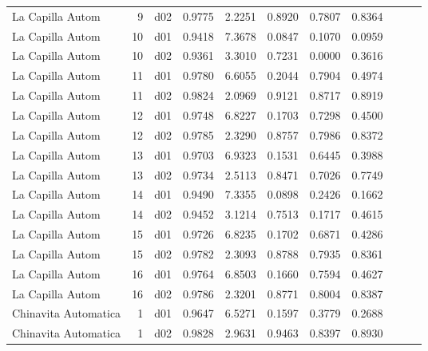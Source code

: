 \begin{landscape}
\begin{longtable}{p{2cm}rrrrrrrrrr}
     La Capilla Autom  &          9 &     d02 &   0.9775 &  2.2251 &        0.8920 &           0.7807 &  0.8364 \\
     La Capilla Autom  &         10 &     d01 &   0.9418 &  7.3678 &        0.0847 &           0.1070 &  0.0959 \\
     La Capilla Autom  &         10 &     d02 &   0.9361 &  3.3010 &        0.7231 &           0.0000 &  0.3616 \\
     La Capilla Autom  &         11 &     d01 &   0.9780 &  6.6055 &        0.2044 &           0.7904 &  0.4974 \\
     La Capilla Autom  &         11 &     d02 &   0.9824 &  2.0969 &        0.9121 &           0.8717 &  0.8919 \\
     La Capilla Autom  &         12 &     d01 &   0.9748 &  6.8227 &        0.1703 &           0.7298 &  0.4500 \\
     La Capilla Autom  &         12 &     d02 &   0.9785 &  2.3290 &        0.8757 &           0.7986 &  0.8372 \\
     La Capilla Autom  &         13 &     d01 &   0.9703 &  6.9323 &        0.1531 &           0.6445 &  0.3988 \\
     La Capilla Autom  &         13 &     d02 &   0.9734 &  2.5113 &        0.8471 &           0.7026 &  0.7749 \\
     La Capilla Autom  &         14 &     d01 &   0.9490 &  7.3355 &        0.0898 &           0.2426 &  0.1662 \\
     La Capilla Autom  &         14 &     d02 &   0.9452 &  3.1214 &        0.7513 &           0.1717 &  0.4615 \\
     La Capilla Autom  &         15 &     d01 &   0.9726 &  6.8235 &        0.1702 &           0.6871 &  0.4286 \\
     La Capilla Autom  &         15 &     d02 &   0.9782 &  2.3093 &        0.8788 &           0.7935 &  0.8361 \\
     La Capilla Autom  &         16 &     d01 &   0.9764 &  6.8503 &        0.1660 &           0.7594 &  0.4627 \\
     La Capilla Autom  &         16 &     d02 &   0.9786 &  2.3201 &        0.8771 &           0.8004 &  0.8387 \\
 Chinavita Automatica  &          1 &     d01 &   0.9647 &  6.5271 &        0.1597 &           0.3779 &  0.2688 \\
 Chinavita Automatica  &          1 &     d02 &   0.9828 &  2.9631 &        0.9463 &           0.8397 &  0.8930 \\

\end{longtable}
\end{landscape}
